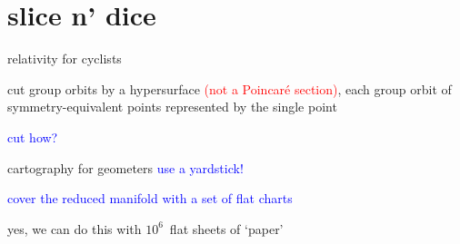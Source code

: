 \section[slice n' dice]{slice n' dice}

\begin{frame}{relativity for cyclists}
\begin{block}{\mslices}

\bigskip
cut group orbits by a hypersurface
\textcolor{red}{(not a Poincar\'e section)}, each group orbit of
symmetry-equivalent points represented by the single point
\end{block}
\bigskip
\textcolor{blue}{\Large cut how?}
\end{frame}

\begin{frame}{cartography for geometers}
\textcolor{blue}{\Large use a yardstick!}

\bigskip

\textcolor{blue}{cover the reduced manifold with a set of flat charts}

\hfill
\vfill
yes, we can do this with $10^6$\dmn\ flat sheets of `paper'
\end{frame}

